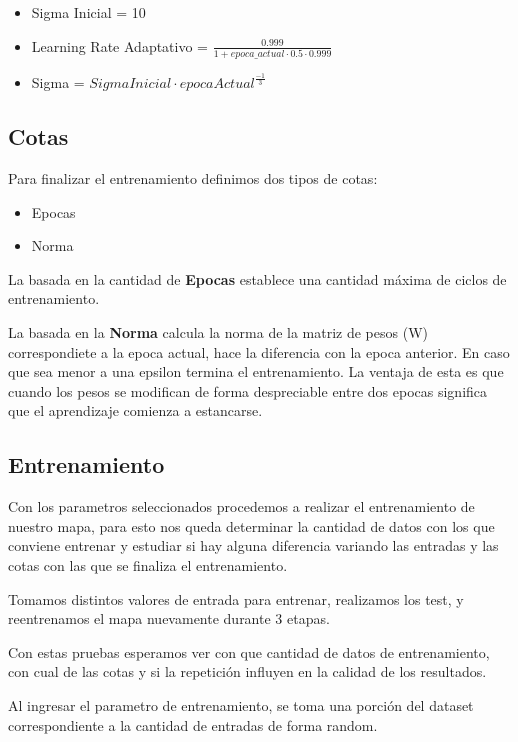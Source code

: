 \begin{itemize}
	\item Sigma Inicial = 10
	\item Learning Rate Adaptativo = $\frac{0.999}{1 + epoca\_actual \cdot 0.5 \cdot 0.999}$
	\item Sigma = $Sigma Inicial \cdot epocaActual^{\frac{-1}{3}}$
\end{itemize}


\subsection{Cotas}

Para finalizar el entrenamiento definimos dos tipos de cotas:

\begin{itemize}
	\item Epocas
	\item Norma
\end{itemize}

La basada en la cantidad de \textbf{Epocas} establece una cantidad máxima de
ciclos de entrenamiento.

La basada en la \textbf{Norma} calcula la norma de la matriz de pesos (W) 
correspondiete a la epoca actual, hace la diferencia con la epoca anterior.
En caso que sea menor a una epsilon termina el entrenamiento. La ventaja
de esta es que cuando los pesos se modifican de forma despreciable entre
dos epocas significa que el aprendizaje comienza a estancarse.


\subsection{Entrenamiento}

Con los parametros seleccionados procedemos a realizar el entrenamiento de
nuestro mapa, para esto nos queda determinar la cantidad de datos con los que
conviene entrenar y estudiar si hay alguna diferencia variando las entradas
y las cotas con las que se finaliza el entrenamiento.

Tomamos distintos valores de entrada para entrenar, realizamos los test, y
reentrenamos el mapa nuevamente durante 3 etapas.

Con estas pruebas esperamos ver con que cantidad de datos de entrenamiento, 
con cual de las cotas y si la repetición influyen en la calidad de los resultados.

Al ingresar el parametro de entrenamiento, se toma una porción del dataset correspondiente
a la cantidad de entradas de forma random.

